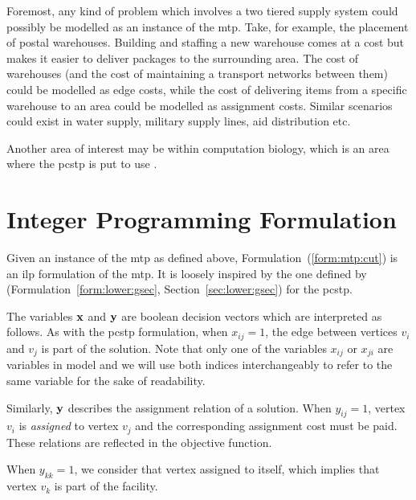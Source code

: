  Foremost, any kind of problem which involves a two tiered supply system could possibly be modelled as an instance of the
 \gls{mtp}. Take, for example, the placement of postal warehouses.
 Building and staffing a new warehouse comes at
 a cost but makes it easier to deliver packages to the surrounding area.
 The cost of warehouses (and the cost of maintaining
 a transport networks between them) could be modelled as edge costs, while the cost of delivering items from a specific warehouse to an area
 could be modelled as assignment costs.  Similar scenarios could exist in water supply, military supply lines, aid distribution etc.

 Another area of interest may be within computation biology, which is an area where the \gls{pcstp} is put to use
 \citep{akhmedov2016divide, sun2018classical}.
\section{Integer Programming Formulation}

Given an instance of the \gls{mtp} as defined above,
Formulation~(\ref{form:mtp:cut}) is an \gls{ilp} formulation of the \gls{mtp}.
It is loosely inspired by the one defined by \citet{lucena2004strong}
(Formulation~\ref{form:lower:gsec}, Section~\ref{sec:lower:gsec}) for the
\gls{pcstp}.

The variables $\mathbf{x}$ and $\mathbf{y}$ are boolean
decision vectors which are interpreted as follows.
As with the \gls{pcstp} formulation, when $x_{ij} = 1$,
the edge between vertices $v_i$ and $v_j$ is part of the solution.
Note that only
one of the variables $x_{ij}$ or $x_{ji}$ are variables
in model and we will use both indices interchangeably
to refer to the same variable for the sake of readability.

Similarly, $\mathbf{y}$ describes the assignment relation of a solution. When
$y_{ij} = 1$, vertex $v_i$ is \textit{assigned} to vertex $v_j$ and the corresponding
assignment cost must be paid.
These relations are reflected in the objective function.

When $y_{kk} = 1$, we consider that vertex assigned to
itself, which implies that vertex $v_k$ is part of the facility.

